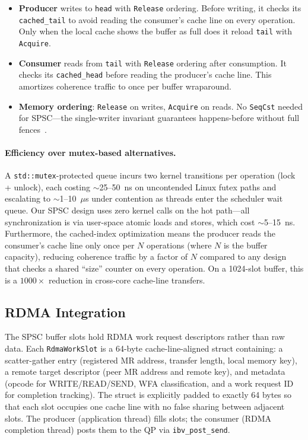\documentclass[11pt,letterpaper]{article}
\begin{document}
\begin{itemize}
    \item \textbf{Producer} writes to \texttt{head} with \texttt{Release} ordering. Before writing, it checks its \texttt{cached\_tail} to avoid reading the consumer's cache line on every operation. Only when the local cache shows the buffer as full does it reload \texttt{tail} with \texttt{Acquire}.

    \item \textbf{Consumer} reads from \texttt{tail} with \texttt{Release} ordering after consumption. It checks its \texttt{cached\_head} before reading the producer's cache line. This amortizes coherence traffic to once per buffer wraparound.

    \item \textbf{Memory ordering}: \texttt{Release} on writes, \texttt{Acquire} on reads. No \texttt{SeqCst} needed for SPSC---the single-writer invariant guarantees happens-before without full fences~\cite{boehm2008foundations}.
\end{itemize}

\paragraph{Efficiency over mutex-based alternatives.}
A \texttt{std::mutex}-protected queue incurs two kernel transitions per operation (lock + unlock), each costing ${\sim}$25--50~ns on uncontended Linux futex paths and escalating to ${\sim}$1--10~$\mu$s under contention as threads enter the scheduler wait queue. Our SPSC design uses zero kernel calls on the hot path---all synchronization is via user-space atomic loads and stores, which cost ${\sim}$5--15~ns. Furthermore, the cached-index optimization means the producer reads the consumer's cache line only once per $N$ operations (where $N$ is the buffer capacity), reducing coherence traffic by a factor of $N$ compared to any design that checks a shared ``size'' counter on every operation. On a 1024-slot buffer, this is a $1000\times$ reduction in cross-core cache-line transfers.

\subsection{RDMA Integration}

The SPSC buffer slots hold RDMA work request descriptors rather than raw data. Each \texttt{RdmaWorkSlot} is a 64-byte cache-line-aligned struct containing: a scatter-gather entry (registered MR address, transfer length, local memory key), a remote target descriptor (peer MR address and remote key), and metadata (opcode for WRITE/READ/SEND, WFA classification, and a work request ID for completion tracking). The struct is explicitly padded to exactly 64 bytes so that each slot occupies one cache line with no false sharing between adjacent slots. The producer (application thread) fills slots; the consumer (RDMA completion thread) posts them to the QP via \texttt{ibv\_post\_send}.
\end{document}
